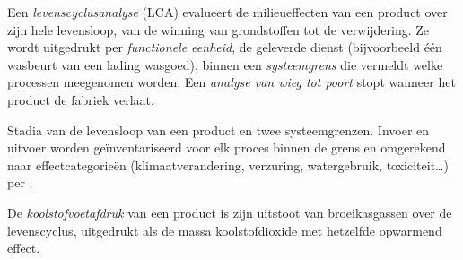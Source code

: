 \begin{definition}[Levenscyclusanalyse]\label{def:b3:green-industrial:lca}
Een \emph{levenscyclusanalyse} (LCA) evalueert
de milieueffecten van een product over zijn hele levensloop, van de
winning van grondstoffen tot de verwijdering. Ze wordt uitgedrukt per
\emph{functionele eenheid}, de geleverde dienst
(bijvoorbeeld één wasbeurt van een lading wasgoed), binnen een
\emph{systeemgrens} die vermeldt welke processen
meegenomen worden. Een
\emph{analyse van wieg tot poort}
stopt wanneer het product de fabriek verlaat.
\end{definition}

\begin{omfigure}

{\small Stadia van de levensloop van een product en twee systeemgrenzen.
Invoer en uitvoer worden geïnventariseerd voor elk proces binnen de
grens en omgerekend naar effectcategorieën (klimaatverandering,
verzuring, watergebruik, toxiciteit\dots) per
.}
\end{omfigure}

\begin{definition}[Koolstofvoetafdruk]\label{def:b3:green-industrial:carbon-footprint}
De \emph{koolstofvoetafdruk} van een product is
zijn uitstoot van broeikasgassen over de levenscyclus, uitgedrukt als de
massa koolstofdioxide met hetzelfde opwarmend effect.
\end{definition}


